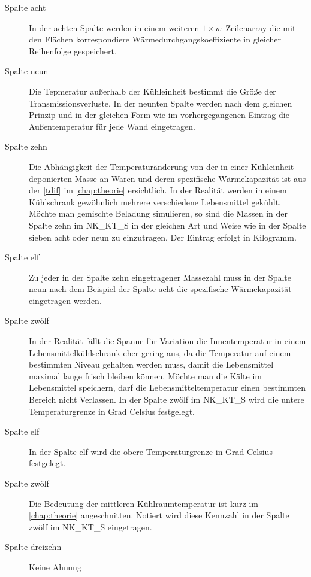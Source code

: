 \begin{description}
	\item [{Spalte acht}] In der achten Spalte werden in einem weiteren $1\times w\,$-Zeilenarray die mit den Flächen
	korrespondiere Wärmedurchgangskoeffiziente in gleicher Reihenfolge gespeichert.

	\item [{Spalte neun}] Die Tepmeratur außerhalb der Kühleinheit bestimmt die Größe der
	Transmissionsverluste. In der neunten Spalte werden nach dem gleichen Prinzip und in der gleichen Form wie im
	vorhergegangenen Eintrag die Außentemperatur für jede Wand eingetragen.

	\item [{Spalte zehn}] Die Abhängigkeit der Temperaturänderung von der in einer Kühleinheit deponierten Masse an Waren
	und deren spezifische Wärmekapazität ist aus der \cref{tdif} im \cref{chap:theorie} ersichtlich. In der Realität
	werden in einem Kühlschrank gewöhnlich mehrere verschiedene Lebensmittel gekühlt. Möchte man gemischte Beladung
	simulieren, so sind die Massen in der Spalte zehn im NK\_KT\_S in der gleichen Art und Weise wie in der Spalte
	sieben acht oder neun zu einzutragen. Der Eintrag erfolgt in Kilogramm.

	\item [{Spalte elf}] Zu jeder in der Spalte zehn eingetragener Massezahl muss in der Spalte neun nach dem Beispiel der
	Spalte acht die spezifische Wärmekapazität eingetragen werden.

	\item [{Spalte zwölf}] In der Realität fällt die Spanne für Variation die Innentemperatur in einem
	Lebensmittelkühlschrank eher gering aus, da die Temperatur auf einem bestimmten Niveau gehalten werden muss, damit die
	Lebensmittel maximal lange frisch bleiben können. Möchte man die Kälte im Lebensmittel speichern, darf die
	Lebensmitteltemperatur einen bestimmten Bereich nicht Verlassen. In der Spalte zwölf im NK\_KT\_S wird die untere
	Temperaturgrenze in Grad Celsius festgelegt.

	\item [{Spalte elf}] In der Spalte elf wird die obere Temperaturgrenze in Grad Celsius festgelegt.

	\item [{Spalte zwölf}] Die Bedeutung der
	mittleren Kühlraumtemperatur ist kurz im \cref{chap:theorie} angeschnitten. Notiert wird diese Kennzahl in der Spalte
	zwölf im NK\_KT\_S eingetragen.

	\item [{Spalte dreizehn}] Keine Ahnung

\end{description}
